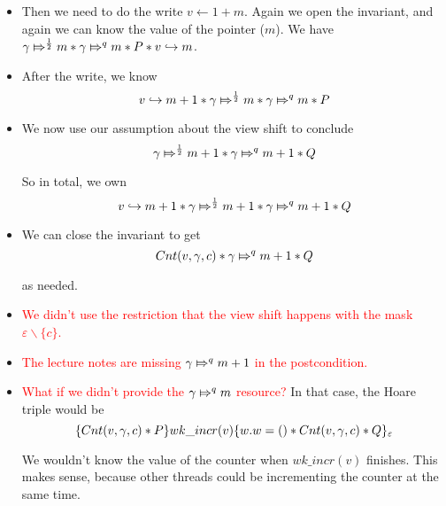 \begin{enumerate}
\begin{itemize}
\item Then we need to do the write $v \gets 1 + m$. Again we open the invariant, and again we can know the value of the pointer ($m$). We have $\apointsto{\gamma}{m}{\frac{1}{2}} * \apointsto{\gamma}{m}{q} * P * \pointsto{v}{m}$.

\item After the write, we know
\[
 \pointsto{v}{m + 1} * \apointsto{\gamma}{m}{\frac{1}{2}} * \apointsto{\gamma}{m}{q} * P
\]

\item We now use our assumption about the view shift to conclude 
\[
\apointsto{\gamma}{m + 1}{\frac{1}{2}} * \apointsto{\gamma}{m + 1}{q} * Q
\]

So in total, we own
\[
 \pointsto{v}{m + 1}  * \apointsto{\gamma}{m + 1}{\frac{1}{2}} * \apointsto{\gamma}{m + 1}{q} * Q
\]

\item We can close the invariant to get
\[
\Cnt{v}{\gamma}{c} * \apointsto{\gamma}{m + 1}{q} * Q
\]

as needed.

\item \textcolor{red}{We didn't use the restriction that the view shift happens with the mask $\varepsilon \backslash \{ c \}$.}

\item \textcolor{red}{The lecture notes are missing $\apointsto{\gamma}{m + 1}{q}$ in the postcondition.}

\item \textcolor{red}{What if we didn't provide the $\apointsto{\gamma}{m}{q}$ resource?}  In that case, the Hoare triple would be
\[
\hot{\Cnt{v}{\gamma}{c} * P}{wk\_incr(v)}{w. w = () * \Cnt{v}{\gamma}{c} * Q}_{\varepsilon}
\]

We wouldn't know the value of the counter when $wk\_incr(v)$ finishes. This makes sense, because other threads could be incrementing the counter at the same time.

\end{itemize}

\end{enumerate}